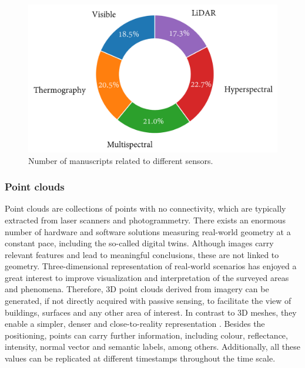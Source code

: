 \begin{figure}[ht]
	\includegraphics[width=.9\textwidth]{figs/fundamentals/literature_sensors.png}
	\caption{Number of manuscripts related to different sensors.  }
    \label{fig:sensor_literature}
\end{figure}

\subsubsection{Point clouds}

Point clouds are collections of points with no connectivity, which are typically extracted from laser scanners and photogrammetry. There exists an enormous number of hardware and software solutions measuring real-world geometry at a constant pace, including the so-called digital twins. Although images carry relevant features and lead to meaningful conclusions, these are not linked to geometry. Three-dimensional representation of real-world scenarios has enjoyed a great interest to improve visualization and interpretation of the surveyed areas and phenomena. Therefore, 3D point clouds derived from imagery can be generated, if not directly acquired with passive sensing, to facilitate the view of buildings, surfaces and any other area of interest. In contrast to 3D meshes, they enable a simpler, denser and close-to-reality representation \cite{cao_3d_2019}. Besides the positioning, points can carry further information, including colour, reflectance, intensity, normal vector and semantic labels, among others. Additionally, all these values can be replicated at different timestamps throughout the time scale. 

